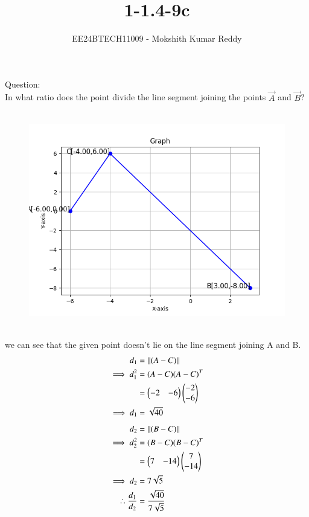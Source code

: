 \documentclass[journal]{IEEEtran}
\begin{document}

\vspace{3cm}

\title{1-1.4-9c}
\author{EE24BTECH11009 - Mokshith Kumar Reddy}
{\let\newpage\relax\maketitle}

\renewcommand{\thefigure}{\theenumi}
\renewcommand{\thetable}{\theenumi}
\setlength{\intextsep}{10pt} %


\renewcommand{\thetable}{\theenumi}
Question:\\
 In what ratio does the point  divide the line segment joining the points $\vec{A}$ and $\vec{B}$?\\
\solution\\
\begin{figure}[h!]
   \centering
   \includegraphics[width=0.7\linewidth]{figs/plot.png}
   \caption{ }
   \label{stemplot}
\end{figure}\\
 we can see that the given point doesn't lie on the line segment joining A and B.\\
\begin{align}
d_1&=\left\|{(A-C)}\right\|\\
\implies d_1^2&= (A-C)(A-C)^T\\
&=\begin{pmatrix}
-2 & -6
\end{pmatrix}
\begin{pmatrix}
-2\\
-6
\end{pmatrix}\\
\implies d_1&=\sqrt{40}\\
\end{align}
\begin{align}
d_2&=\left\|{(B-C)}\right\|\\
\implies d_2^2&=(B-C)(B-C)^T\\
&=\begin{pmatrix}
7 & -14
\end{pmatrix}
\begin{pmatrix}
7\\
-14
\end{pmatrix}\\
\implies d_2&=7\sqrt{5}\\
\therefore \frac{d_1}{d_2} &= \frac{\sqrt{40}}{7\sqrt{5}}
\end{align}
\begin{table}[h]
    \centering
    
    \caption{  }
    \label{tab.1}
\end{table}
\end{document}
